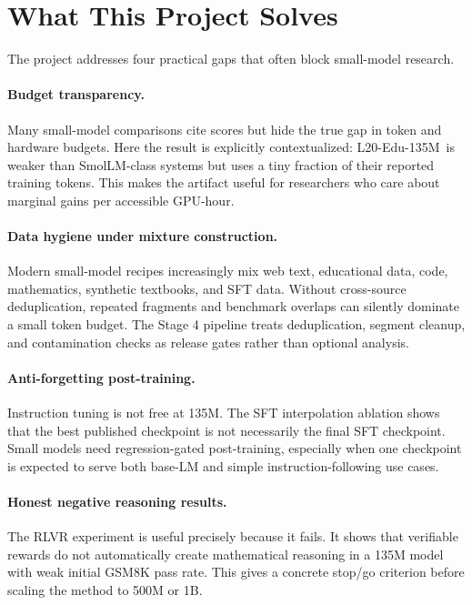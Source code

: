 \documentclass[11pt]{article}
\newcommand{\model}{L20-Edu-135M}
\begin{document}
\section{What This Project Solves}

The project addresses four practical gaps that often block small-model research.

\paragraph{Budget transparency.}
Many small-model comparisons cite scores but hide the true gap in token and hardware budgets. Here the result is explicitly contextualized: \model\ is weaker than SmolLM-class systems but uses a tiny fraction of their reported training tokens. This makes the artifact useful for researchers who care about marginal gains per accessible GPU-hour.

\paragraph{Data hygiene under mixture construction.}
Modern small-model recipes increasingly mix web text, educational data, code, mathematics, synthetic textbooks, and SFT data. Without cross-source deduplication, repeated fragments and benchmark overlaps can silently dominate a small token budget. The Stage 4 pipeline treats deduplication, segment cleanup, and contamination checks as release gates rather than optional analysis.

\paragraph{Anti-forgetting post-training.}
Instruction tuning is not free at 135M. The SFT interpolation ablation shows that the best published checkpoint is not necessarily the final SFT checkpoint. Small models need regression-gated post-training, especially when one checkpoint is expected to serve both base-LM and simple instruction-following use cases.

\paragraph{Honest negative reasoning results.}
The RLVR experiment is useful precisely because it fails. It shows that verifiable rewards do not automatically create mathematical reasoning in a 135M model with weak initial GSM8K pass rate. This gives a concrete stop/go criterion before scaling the method to 500M or 1B.
\end{document}
